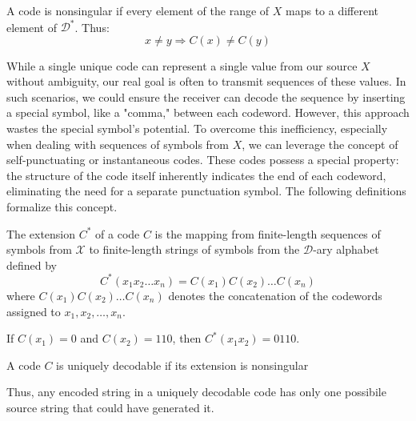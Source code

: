 \begin{definition}\label{def:nonsingular_code}
    A code is nonsingular if every element of the range of $X$ maps to a different element of $\mathcal{D}^*$. Thus:
    \begin{equation}
        x \neq y \Rightarrow C(x) \neq C(y)
    \end{equation}
\end{definition}

\noindent While a single unique code can represent a single value from our source $X$ without ambiguity, our real goal is often to transmit sequences of these values. In such scenarios, we could ensure the receiver can decode the sequence by inserting a special symbol, like a "comma," between each codeword. However, this approach wastes the special symbol's potential. To overcome this inefficiency, especially when dealing with sequences of symbols from $X$, we can leverage the concept of self-punctuating or instantaneous codes. These codes possess a special property: the structure of the code itself inherently indicates the end of each codeword, eliminating the need for a separate punctuation symbol. The following definitions formalize this concept. \cite{ElementsofInformationTheory}

\begin{definition}\label{def:extension_code}
    The extension $C^*$ of a code $C$ is the mapping from finite-length sequences of symbols from $\mathcal{X}$ to finite-length strings of symbols from the $\mathcal{D}$-ary alphabet defined by
    \begin{equation}
        C^*(x_1x_2\ldots x_n) = C(x_1)C(x_2)\ldots C(x_n)
    \end{equation}
    where $C(x_1)C(x_2)\ldots C(x_n)$ denotes the concatenation of the codewords assigned to $x_1, x_2, \ldots, x_n$.
\end{definition}

\begin{example}
    If $C(x_1) = 0$ and $C(x_2) = 110$, then $C^*(x_1x_2) = 0110$.
\end{example}

\begin{definition}\label{def:unique_decodability}
    A code $C$ is uniquely decodable if its extension is nonsingular
\end{definition}

\noindent Thus, any encoded string in a uniquely decodable code has only one possibile source string that could have generated it.

